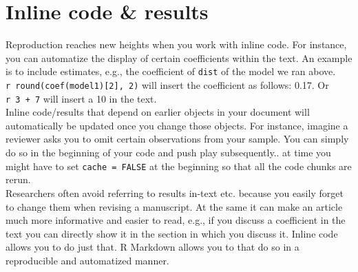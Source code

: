 \documentclass[
  12pt,
]{article}
\begin{document}
\begin{table}[H]

\caption{\label{tab:tab3}Table with kable() and kablestyling()}
\centering
{}
\end{table}

\hypertarget{inline-code-results}{%
\section{Inline code \& results}\label{inline-code-results}}

Reproduction reaches new heights when you work with inline code. For instance, you can automatize the display of certain coefficients within the text. An example is to include estimates, e.g., the coefficient of \texttt{dist} of the model we ran above. \texttt{\textasciigrave{}r\ round(coef(model1){[}2{]},\ 2)\textasciigrave{}} will insert the coefficient as follows: 0.17. Or \texttt{\textasciigrave{}r\ 3\ +\ 7\textasciigrave{}} will insert a 10 in the text.\\
Inline code/results that depend on earlier objects in your document will automatically be updated once you change those objects. For instance, imagine a reviewer asks you to omit certain observations from your sample. You can simply do so in the beginning of your code and push play subsequently.. at time you might have to set \texttt{cache\ =\ FALSE} at the beginning so that all the code chunks are rerun.\\
Researchers often avoid referring to results in-text etc. because you easily forget to change them when revising a manuscript. At the same it can make an article much more informative and easier to read, e.g., if you discuss a coefficient in the text you can directly show it in the section in which you discuss it. Inline code allows you to do just that. R Markdown allows you to that do so in a reproducible and automatized manner.
\end{document}

